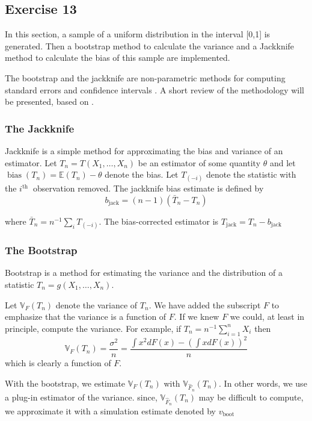 \documentclass[11pt]{article}
\theoremstyle{definition}
\theoremstyle{remark}
\theoremstyle{remark}
\begin{document}
 \subsection*{Exercise 13}
 In this section, a sample of a uniform distribution in the interval
 [0,1] is generated. Then a bootstrap method to calculate the variance
 and a Jackknife method to calculate the bias of this sample are
 implemented.

The bootstrap and the jackknife are non-parametric methods for
computing standard errors and confidence intervals \cite{rodgers1999bootstrap}. A short review of the methodology will be presented, based on \cite{wasserman2006}.

\subsubsection*{The Jackknife}

Jackknife is a simple method for approximating the bias and variance
of an estimator. Let $T_{n}=T\left(X_{1}, \ldots, X_{n}\right)$ be an
estimator of some quantity $\theta$ and let
$\operatorname{bias}\left(T_{n}\right)=\mathbb{E}\left(T_{n}\right)-\theta$
denote the bias. Let $T_{(-i)}$ denote the statistic with the
$i^{\text {th }}$ observation removed. The jackknife bias estimate is
defined by
\[
  b_{\mathrm{jack}}=(n-1)\left(\bar{T}_{n}-T_{n}\right)
\]

where $\bar{T}_{n}=n^{-1} \sum_{i} T_{(-i)}$. The bias-corrected
estimator is $T_{\mathrm{jack}}=T_{n}-b_{\mathrm{jack}}$

\subsubsection*{The Bootstrap}

Bootstrap is a method for estimating the variance and the distribution
of a statistic $T_{n}=g\left(X_{1}, \ldots, X_{n}\right) .$

Let $\mathbb{V}_{F}\left(T_{n}\right)$ denote the variance of
$T_{n} .$ We have added the subscript $F$ to emphasize that the
variance is a function of $F$. If we knew $F$ we could, at least in
principle, compute the variance. For example, if
$T_{n}=n^{-1} \sum_{i=1}^{n} X_{i}$ then
\[
  \mathbb{V}_{F}\left(T_{n}\right)=\frac{\sigma^{2}}{n}=\frac{\int
    x^{2} d F(x)-\left(\int x d F(x)\right)^{2}}{n}
\]
which is clearly a function of $F$.

With the bootstrap, we estimate $\mathbb{V}_{F}\left(T_{n}\right)$
with $\mathbb{V}_{\widehat{F}_{n}}\left(T_{n}\right)$. In other words,
we use a plug-in estimator of the variance. since,
$\mathbb{V}_{\widehat{F}_{n}}\left(T_{n}\right)$ may be difficult to
compute, we approximate it with a simulation estimate denoted by
$v_{\text {boot }}$
\\
\end{document}
